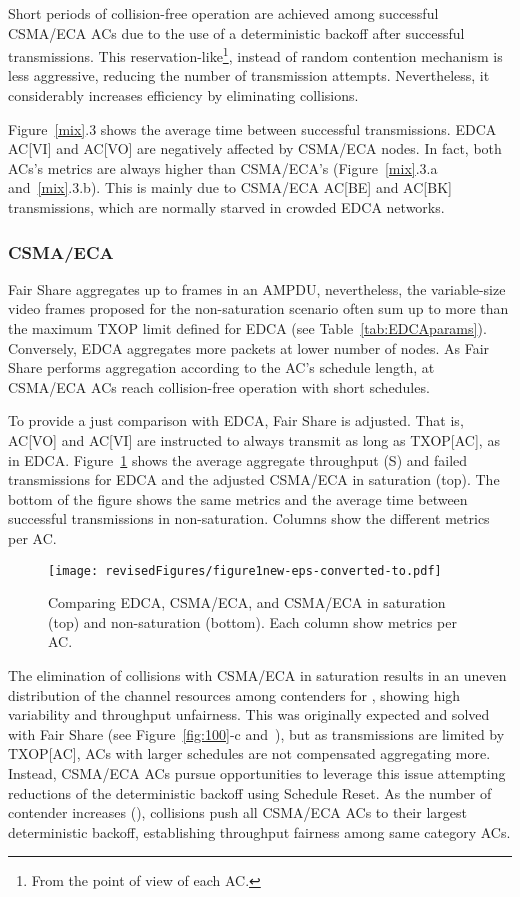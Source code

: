 \documentclass[a4paper]{article}
\begin{document}
Short periods of collision-free operation are achieved among successful CSMA/ECA ACs due to the use of a deterministic backoff after successful transmissions. This reservation-like\footnote{From the point of view of each AC.}, instead of random contention mechanism is less aggressive, reducing the number of transmission attempts. Nevertheless, it considerably increases efficiency by eliminating collisions. 

Figure~\ref{mix}.3 shows the average time between successful transmissions. EDCA AC[VI] and AC[VO] are negatively affected by CSMA/ECA nodes. In fact, both ACs's metrics are always higher than CSMA/ECA's (Figure~\ref{mix}.3.a and~\ref{mix}.3.b). This is mainly due to CSMA/ECA AC[BE] and AC[BK] transmissions, which are normally starved in crowded EDCA networks.

\subsubsection{CSMA/ECA}
Fair Share aggregates up to  frames in an AMPDU, nevertheless, the variable-size video frames proposed for the non-saturation scenario often sum up to more than the maximum TXOP limit defined for EDCA (see Table~\ref{tab:EDCAparams}). Conversely, EDCA aggregates more packets at lower number of nodes. As Fair Share performs aggregation according to the AC's schedule length, at  CSMA/ECA ACs reach collision-free operation with short schedules.

To provide a just comparison with EDCA, Fair Share is adjusted. That is, AC[VO] and AC[VI] are instructed to always transmit as long as TXOP[AC], as in EDCA. Figure~\ref{fig:multiplotSatTXOP} shows the average aggregate throughput (S) and failed transmissions for EDCA and the adjusted CSMA/ECA in saturation (top). The bottom of the figure shows the same metrics and the average time between successful transmissions in non-saturation. Columns show the different metrics per AC.

	\begin{figure}[t]
		\centering
			\texttt{[image: revisedFigures/figure1new-eps-converted-to.pdf]}
			\caption{Comparing EDCA, CSMA/ECA, and CSMA/ECA in saturation (top) and non-saturation (bottom). Each column show metrics per AC.}
			\label{fig:multiplotSatTXOP}
	\end{figure}

The elimination of collisions with CSMA/ECA in saturation results in an uneven distribution of the channel resources among contenders for , showing high variability and throughput unfairness. This was originally expected and solved with Fair Share (see Figure~\ref{fig:100}-c and~\cite{sanabria2014high}), but as transmissions are limited by TXOP[AC], ACs with larger schedules are not compensated aggregating more. Instead, CSMA/ECA ACs pursue opportunities to leverage this issue attempting reductions of the deterministic backoff using Schedule Reset. As the number of contender increases (), collisions push all CSMA/ECA ACs to their largest deterministic backoff, establishing throughput fairness among same category ACs.
\end{document}
